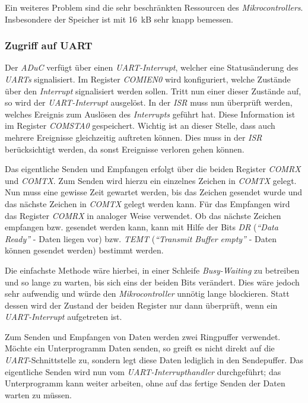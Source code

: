 Ein weiteres Problem sind die sehr beschränkten Ressourcen des \emph{Mikrocontrollers}. Insbesondere der Speicher ist
mit 16~kB sehr knapp bemessen. 


\subsubsection{Zugriff auf UART}
Der \emph{ADuC} verfügt über einen \emph{UART-Interrupt}, welcher eine Statusänderung des \emph{UARTs} signalisiert. 
Im Register \emph{COMIEN0} wird konfiguriert, welche Zustände über den \emph{Interrupt} signalisiert werden sollen. Tritt
nun einer dieser Zustände auf, so wird der \emph{UART-Interrupt} ausgelöst. In der \emph{ISR} muss nun überprüft
werden, welches Ereignis zum Auslösen des \emph{Interrupts} geführt hat. Diese Information ist im Register \emph{COMSTA0} 
gespeichert. Wichtig ist an dieser Stelle, dass auch mehrere Ereignisse gleichzeitig auftreten können. 
Dies muss in der \emph{ISR} berücksichtigt werden, da sonst Ereignisse verloren gehen können.

Das eigentliche Senden und Empfangen erfolgt über die beiden Register \emph{COMRX} und \emph{COMTX}.
Zum Senden wird hierzu ein einzelnes Zeichen in \emph{COMTX} gelegt. Nun muss eine gewisse Zeit gewartet
werden, bis das Zeichen gesendet wurde und das nächste Zeichen in \emph{COMTX} gelegt werden kann.
Für das Empfangen wird das Register \emph{COMRX} in analoger Weise verwendet. Ob das nächste
Zeichen empfangen bzw. gesendet werden kann, kann mit Hilfe der Bits \emph{DR} (\emph{"`Data Ready"'} - Daten liegen vor)
bzw. \emph{TEMT} (\emph{"`Transmit Buffer empty"'} - Daten können gesendet werden) bestimmt werden.

Die einfachste Methode wäre hierbei, in einer Schleife \emph{Busy-Waiting} zu betreiben und so lange zu warten,
bis sich eins der beiden Bits verändert. Dies wäre jedoch sehr aufwendig und würde den \emph{Mikrocontroller}
unnötig lange blockieren. Statt dessen wird der Zustand der beiden Register nur dann überprüft, wenn ein 
\emph{UART-Interrupt} aufgetreten ist.

Zum Senden und Empfangen von Daten werden zwei Ringpuffer verwendet. Möchte ein Unterprogramm Daten senden,
so greift es nicht direkt auf die \emph{UART}-Schnittstelle zu, sondern legt diese Daten lediglich in den Sendepuffer.
Das eigentliche Senden wird nun vom \emph{UART-Interrupthandler} durchgeführt; das Unterprogramm kann weiter arbeiten,
ohne auf das fertige Senden der Daten warten zu müssen.

